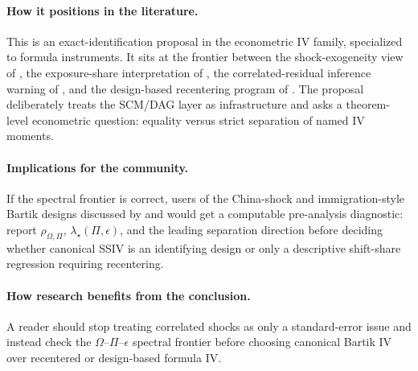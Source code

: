 \documentclass[11pt]{article}
\theoremstyle{definition}
\theoremstyle{plain}
\theoremstyle{remark}
\begin{document}
\paragraph{How it positions in the literature.}
This is an exact-identification proposal in the econometric IV family, specialized to formula instruments.  It sits at the frontier between the shock-exogeneity view of \citet{BorusyakHullJaravel2022REStud}, the exposure-share interpretation of \citet{GoldsmithPinkhamSorkinSwift2020AER}, the correlated-residual inference warning of \citet{AdaoKolesarMorales2019QJE}, and the design-based recentering program of \citet{BorusyakHull2023Econometrica,BorusyakHullJaravel2025ECTJ}.  The proposal deliberately treats the SCM/DAG layer as infrastructure and asks a theorem-level econometric question: equality versus strict separation of named IV moments.

\paragraph{Implications for the community.}
If the spectral frontier is correct, users of the China-shock and immigration-style Bartik designs discussed by \citet{BorusyakHullJaravel2022REStud} and \citet{JaegerRuistStuhler2018NBER} would get a computable pre-analysis diagnostic: report $\rho_{\Omega,\Pi}$, $\lambda_\star(\Pi,\epsilon)$, and the leading separation direction before deciding whether canonical SSIV is an identifying design or only a descriptive shift-share regression requiring recentering.

\paragraph{How research benefits from the conclusion.}
A reader should stop treating correlated shocks as only a standard-error issue and instead check the $\Omega$--$\Pi$--$\epsilon$ spectral frontier before choosing canonical Bartik IV over recentered or design-based formula IV.
\end{document}
